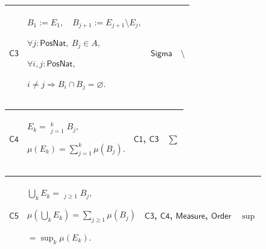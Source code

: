 \documentclass[11pt]{amsart}
\newlength{\FTCFourColumnBody}
\begin{document}
{\begin{tabular}
\end{tabular}%
\par\setlength{\parskip}{0pt}\nointerlineskip
\noindent
\begin{tabular}{|@{}>{\centering\arraybackslash}m{0.078431\FTCFourColumnBody}|>{\centering\arraybackslash}m{0.535947\FTCFourColumnBody}|>{\centering\arraybackslash}m{0.281045\FTCFourColumnBody}|>{\centering\arraybackslash}m{0.104575\FTCFourColumnBody}|}\hline
\hypertarget{proof:C3}{$\displaystyle \textsf{C3}$} & $\displaystyle B_1:=E_1,\quad B_{j+1}:=E_{j+1}\setminus E_j,$\par
$\displaystyle \forall j:\textsf{PosNat},\ B_j\in A,$\par
$\displaystyle \forall i,j:\textsf{PosNat},$\par
$\displaystyle i\ne j\Rightarrow B_i\cap B_j=\varnothing.$ & \hyperlink{ax:Sigma}{$\displaystyle \textsf{Sigma}$} & $\displaystyle \setminus$\\ \hline
\end{tabular}%
\par\setlength{\parskip}{0pt}\nointerlineskip
\noindent
\begin{tabular}{|@{}>{\centering\arraybackslash}m{0.078431\FTCFourColumnBody}|>{\centering\arraybackslash}m{0.535947\FTCFourColumnBody}|>{\centering\arraybackslash}m{0.281045\FTCFourColumnBody}|>{\centering\arraybackslash}m{0.104575\FTCFourColumnBody}|}\hline
\hypertarget{proof:C4}{$\displaystyle \textsf{C4}$} & $\displaystyle E_k=\mathop{\dot\bigcup}_{j=1}^kB_j,$\par
$\displaystyle \mu(E_k)=\sum_{j=1}^k\mu(B_j).$ & \hyperlink{proof:C1}{$\displaystyle \textsf{C1}$}, \hyperlink{proof:C3}{$\displaystyle \textsf{C3}$} & $\displaystyle \sum$\\ \hline
\end{tabular}%
\par\setlength{\parskip}{0pt}\nointerlineskip
\noindent
\begin{tabular}{|@{}>{\centering\arraybackslash}m{0.078431\FTCFourColumnBody}|>{\centering\arraybackslash}m{0.535947\FTCFourColumnBody}|>{\centering\arraybackslash}m{0.281045\FTCFourColumnBody}|>{\centering\arraybackslash}m{0.104575\FTCFourColumnBody}|}\hline
\hypertarget{proof:C5}{$\displaystyle \textsf{C5}$} & $\displaystyle \bigcup_kE_k=\mathop{\dot\bigcup}_{j\ge1}B_j,$\par
$\displaystyle \mu(\bigcup_kE_k)=\sum_{j\ge1}\mu(B_j)$\par
$\displaystyle {}=\sup_k\mu(E_k).$ & \hyperlink{proof:C3}{$\displaystyle \textsf{C3}$}, \hyperlink{proof:C4}{$\displaystyle \textsf{C4}$}, \hyperlink{ax:Measure}{$\displaystyle \textsf{Measure}$}, \hyperlink{ax:Order}{$\displaystyle \textsf{Order}$} & $\displaystyle \sup$\\ \hline

\end{tabular}}
\end{document}
